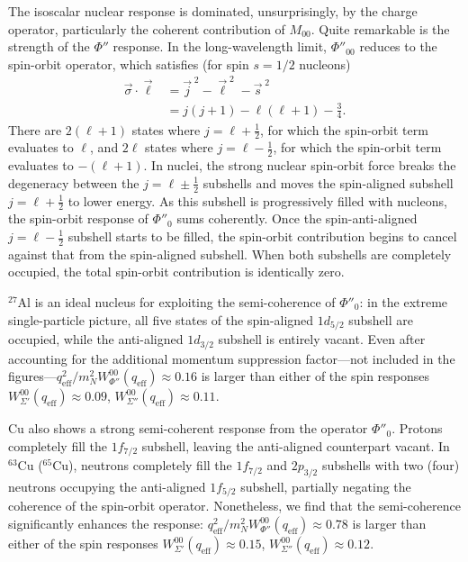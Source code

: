 \documentclass[12pt,letterpaper]{book}
\begin{document}
The isoscalar nuclear response is dominated, unsurprisingly, by the charge operator, particularly the coherent contribution of $M_{00}$. Quite remarkable is the strength of the $\Phi''$ response. In the long-wavelength limit, $\Phi''_{00}$ reduces to the spin-orbit operator, which satisfies (for spin $s=1/2$ nucleons)
\begin{equation}
\begin{split}
\vec{\sigma}\cdot\vec{\ell}&=\vec{j}^{\;2}-\vec{\ell}^{\;2}-\vec{s}^{\;2}\\
&=j(j+1)-\ell(\ell+1)-\frac{3}{4}.
\end{split}
\end{equation}
There are $2(\ell+1)$ states where $j=\ell+\frac{1}{2}$, for which the spin-orbit term evaluates to $\ell$, and $2\ell$ states where $j=\ell-\frac{1}{2}$, for which the spin-orbit term evaluates to $-(\ell+1)$. In nuclei, the strong nuclear spin-orbit force breaks the degeneracy between the $j=\ell\pm\frac{1}{2}$ subshells and moves the spin-aligned subshell $j=\ell+\frac{1}{2}$ to lower energy. As this subshell is progressively filled with nucleons, the spin-orbit response of $\Phi''_{0}$ sums coherently. Once the spin-anti-aligned $j=\ell-\frac{1}{2}$ subshell starts to be filled, the spin-orbit contribution begins to cancel against that from the spin-aligned subshell. When both subshells are completely occupied, the total spin-orbit contribution is identically zero.

$^{27}$Al is an ideal nucleus for exploiting the semi-coherence of $\Phi''_{0}$: in the extreme single-particle picture, all five states of the spin-aligned $1d_{5/2}$ subshell are occupied, while the anti-aligned $1d_{3/2}$ subshell is entirely vacant. Even after accounting for the additional momentum suppression factor---not included in the figures---$q_\mathrm{eff}^2/m_N^2W_{\Phi''}^{00}(q_\mathrm{eff})\approx 0.16$ is larger than either of the spin responses $W_{\Sigma'}^{00}(q_\mathrm{eff})\approx 0.09$, $W_{\Sigma''}^{00}(q_\mathrm{eff})\approx 0.11$. 

Cu also shows a strong semi-coherent response from the operator $\Phi''_0$. Protons completely fill the $1f_{7/2}$ subshell, leaving the anti-aligned counterpart vacant. In $^{63}$Cu ($^{65}$Cu), neutrons completely fill the $1f_{7/2}$ and $2p_{3/2}$ subshells with two (four) neutrons occupying the anti-aligned $1f_{5/2}$ subshell, partially negating the coherence of the spin-orbit operator.  Nonetheless, we find that the semi-coherence significantly enhances the response: $q_\mathrm{eff}^2/m_N^2W_{\Phi''}^{00}(q_\mathrm{eff})\approx 0.78$ is larger than either of the spin responses $W_{\Sigma'}^{00}(q_\mathrm{eff})\approx 0.15$, $W_{\Sigma''}^{00}(q_\mathrm{eff})\approx 0.12$. 
\end{document}
